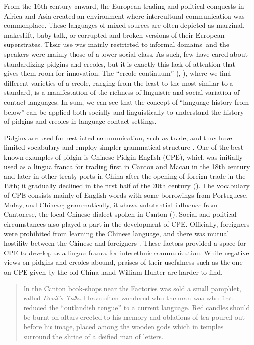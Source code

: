\documentclass[output=paper]{langsci/langscibook}
\begin{document}
From the 16th century onward, the European trading and political conquests in Africa and Asia created an environment where intercultural communication was commonplace. These languages of mixed sources are often depicted as marginal, makeshift, baby talk, or corrupted and broken versions of their European superstrates. Their use was mainly restricted to informal domains, and the speakers were mainly those of a lower social class. As such, few have cared about standardizing pidgins and creoles, but it is exactly this lack of attention that gives them room for innovation. The “creole continuum” (\citealt{stewart_urban_1965}, \citealt{bickerton_dynamics_1975}), where we find different varieties of a creole, ranging from the least to the most similar to a standard, is a manifestation of the richness of linguistic and social variation of contact languages. In sum, we can see that the concept of “language history from below” can be applied both socially and linguistically to understand the history of pidgins and creoles in language contact settings. 

Pidgins are used for restricted communication, such as trade, and thus have limited vocabulary and employ simpler grammatical structure \citep[5]{holm_introduction_2000}. One of the best-known examples of pidgin is Chinese Pidgin English (CPE), which was initially used as a lingua franca for trading first in Canton and Macau in the 18th century and later in other treaty ports in China after the opening of foreign trade in the 19th; it gradually declined in the first half of the 20th century (\citealt{michaelis_chinese_2013}). The vocabulary of CPE consists mainly of English words with some borrowings from Portuguese, Malay, and Chinese; grammatically, it shows substantial influence from Cantonese, the local Chinese dialect spoken in Canton (\citealt{ansaldo_china_2010}). Social and political circumstances also played a part in the development of CPE. Officially, foreigners were prohibited from learning the Chinese language, and there was mutual hostility between the Chinese and foreigners \citep{baker_off_1990}. These factors provided a space for CPE to develop as a lingua franca for interethnic communication. While negative views on pidgins and creoles abound, praises of their usefulness such as the one on CPE given by the old China hand William Hunter are harder to find.

\begin{quote}
    In the Canton book-shops near the Factories was sold a small pamphlet, called \textit{Devil’s Talk}…I have often wondered who the man was who first reduced the ``outlandish tongue'' to a current language. Red candles should be burnt on altars erected to his memory and oblations of tea poured out before his image, placed among the wooden gods which in temples surround the shrine of a deified man of letters. \citep[63]{hunter_fan_1882}  
\end{quote}
\end{document}
